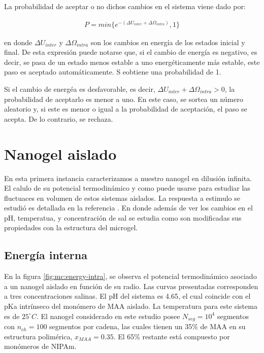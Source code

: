 	
	La probabilidad de aceptar o no dichos cambios en el sistema viene dado por:
	
	\begin{align}
		P = min \{e^{-(\Delta U_{inter} + \Delta \Omega_{intra})},1\}
	\end{align}
	
	\noindent en donde $\Delta U_{inter}$ y $\Delta\Omega_{intra}$ son los cambios en energ\'ia de los estados inicial y final. De esta expresi\'on puede notarse que, si el cambio de energ\'ia es negativo, es decir, se pasa de un estado menos estable a uno energ\'eticamente m\'as estable, este paso es aceptado autom\'aticamente. S eobtiene una probabilidad de 1. 
	
	Si el cambio de energ\'ea es desfavorable, es decir, $\Delta U_{inter} + \Delta \Omega_{intra} > 0$, la probabilidad de aceptarlo es menor a uno. En este caso, se sortea un n\'umero aleatorio y, si este es menor o igual a la probabilidad de aceptaci\'on, el paso se acepta. De lo contrario, se rechaza. 
	
	
	\section{Nanogel aislado}
	
	En esta primera instancia caracterizamos a nuestro nanogel en dilusi\'on infinita. El calulo de su potencial termodin\'amico y como puede usarse para estudiar las fluctuaces en volumen de estos sistemas aislados.
	La respuesta a estimulo se estudi\'o es detallada en la referencia \cite{perez2021thermodynamic}. En donde adem\'as de ver los cambios en el pH, temperatua, y concentraci\'on de sal se estudia como son modificadas sus propiedades con la estructura del microgel.
	
	\subsection{Energ\'ia interna}
	
	En la figura \ref{fig:mc:energy-intra}, se observa el potencial termodin\'amico asociado a un nanogel aislado en funci\'on de su radio. Las curvas presentadas corresponden a tres concentraciones salinas. El pH del sistema es 4.65, el cual coincide con el pKa intr\'inseco del mon\'omero de MAA aislado. La temperatura para este sistema es de $25 ^\circ C$.
	El nanogel considerado en este estudio posee $N_{seg}=10^4$ segmentos con $n_{ch}=100$ segmentos por cadena, las cuales tienen un 35\% de MAA en su estructura polim\'erica, $x_{MAA}=0.35$. El 65\% restante est\'a compuesto por mon\'omeros de NIPAm.
	

